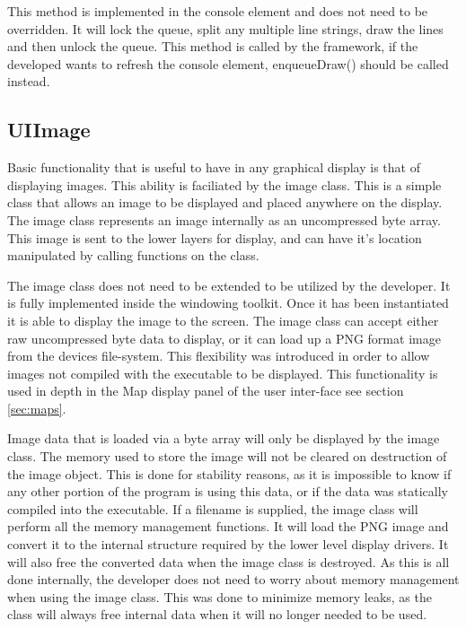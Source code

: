 This method is implemented in the console element and does not need to be overridden. It will lock the queue, split any multiple line strings, draw the lines and then unlock the queue. This method is called by the framework, if the developed wants to refresh the console element, enqueueDraw() should be called instead.

\subsection{UIImage}

Basic functionality that is useful to have in any graphical display is that of displaying images. This ability is faciliated by the image class. This is a simple class that allows an image to be displayed and placed anywhere on the display. The image class represents an image internally as an uncompressed byte array. This image is sent to the lower layers for display, and can have it's location manipulated by calling functions on the class.

The image class does not need to be extended to be utilized by the  developer. It is fully implemented inside the windowing toolkit. Once it has been instantiated it is able to display the image to the screen. The image class can accept either raw uncompressed byte data to display, or it can load up a PNG format image from the devices file-system. This flexibility was introduced in order to allow images not compiled with the executable to be displayed. This functionality is used in depth in the Map display panel of the user inter-face see section \ref{sec:maps}.

Image data that is loaded via a byte array will only be displayed by the image class. The memory used to store the image will not be cleared on destruction of the image object. This is done for stability reasons, as it is impossible to know if any other portion of the program is using this data, or if the data was statically compiled into the executable. If a filename is supplied, the image class will perform all the memory management functions. It will load the PNG image and convert it to the internal structure required by the lower level display drivers. It will also free the converted data when the image class is destroyed. As this is all done internally, the developer does not need to worry about memory management when using the image class. This was done to minimize memory leaks, as the class will always free internal data when it will no longer needed to be used.

